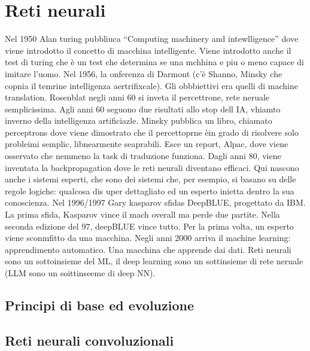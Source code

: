 
\chapter{Reti neurali}\label{chp:neural-networks}
% 
Nel 1950 Alan turing pubbliuca ``Computing machinery and intewlligence'' dove viene introdotto il concetto di macchina intelligente. Viene introdotto anche il test di turing che è un test che determina se una mchhina e piu o meno capace di imitare l'uomo. Nel 1956, la onferenza di Darmont (c'è Shanno, Minsky che copnia il temrine intelligenza aertrifixcale). Gli obbbiettivi era quelli di machine translation. Rosenblat negli anni 60 si inveta il percettrone, rete neruale semplicissima. Agli anni 60 seguono due risultati allo stop dell IA, vhiamto inverno della intelligenza artificiazle. Minsky pubblica un libro, chiamato perceptrons dove viene dimostrato che il percettoprne èin grado di risolvere solo probleimi semplic, libnearmente seaprabili. Esce un report, Alpac, dove viene osservato che nemmeno la task di traduzione funziona. Dagli anni 80, viene inventata la backpropagation dove le reti neurali diventano efficaci. Qui nascono anche i sistemi esperti, che sono dei sistemi che, per esempio, si basano su delle regole logiche: qualcosa dis uper dettagliato ed un esperto inietta dentro la sua conoscienza. Nel 1996/1997 Gary kasparov sfidas DeepBLUE, progettato da IBM. La prima sfida, Kasparov vince il mach overall ma perde due partite. Nella seconda edizione del 97, deepBLUE vince tutto. Per la prima volta, un esperto viene sconmfitto da una macchina. Negli anni 2000 arriva il machine learning: apprendimento automatico. Una macchina che apprende dai dati.  Reti neurali sono un sottoinsieme del ML, il deep learning sono un sottinsieme di rete neruale (LLM sono un soittinseeme di deep NN). 

\section{Principi di base ed evoluzione}



\section{Reti neurali convoluzionali}



\begin{comment}
    Video Enkk:         https://www.youtube.com/watch?v=QB4FR8U0N6g&t=1885s
    Deep learning:      https://www.nature.com/articles/nature14539
    Storia:             https://books.google.it/books?hl=it&lr=&id=GpYFEAAAQBAJ&oi=fnd&pg=PA393&dq=History+of+artificial+intelligence&ots=V4Y3JAo1le&sig=vCrUSwvkSHjayS99EKLAHkEa_8s&redir_esc=y#v=onepage&q=History%
\end{comment}
